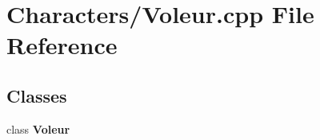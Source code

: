 \section{Characters/\-Voleur.cpp File Reference}
\label{_voleur_8cpp}
\subsection*{Classes}
\begin{DoxyCompactItemize}
\item 
class {\bf Voleur}
\end{DoxyCompactItemize}
